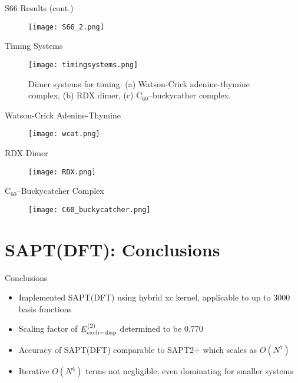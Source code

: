 \documentclass{beamer}
\begin{document}
    \begin{frame}{S66 Results (cont.)}
        \begin{figure}
            \centering
            \texttt{[image: S66\_2.png]}
        \end{figure}
    \end{frame}

    \begin{frame}{Timing Systems}
        \begin{figure}
            \centering
            \texttt{[image: timingsystems.png]}
            \caption{Dimer systems for timing: (a) Watson-Crick adenine-thymine complex, (b) RDX dimer, (c) C$_{\textrm{60}}$--buckycather complex.}
        \end{figure}
    \end{frame}

    \begin{frame}{Watson-Crick Adenine-Thymine}
        \begin{figure}
            \centering
            \texttt{[image: wcat.png]}
        \end{figure}
    \end{frame}

    \begin{frame}{RDX Dimer}
        \begin{figure}
            \centering
            \texttt{[image: RDX.png]}
        \end{figure}
    \end{frame}

    \begin{frame}{C$_{\textrm{60}}$--Buckycatcher Complex}
        \begin{figure}
            \centering
            \texttt{[image: C60\_buckycatcher.png]}
        \end{figure}
    \end{frame}

\section{SAPT(DFT): Conclusions}

    \begin{frame}{Conclusions}
       \begin{itemize}
            \item Implemented SAPT(DFT) using hybrid xc kernel, applicable to up to 3000 basis functions
            \item Scaling factor of $E_{\rm{exch-disp}}^{(2)}$ determined to be 0.770
            \item Accuracy of SAPT(DFT) comparable to SAPT2+ which scales as $O(N^7)$
            \item Iterative $O(N^4)$ terms not negligible; even dominating for smaller systems
       \end{itemize}
    \end{frame}
\end{document}
